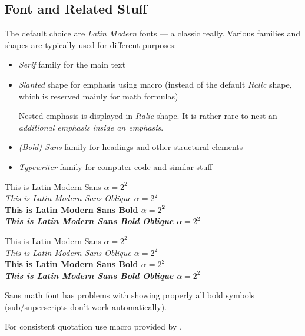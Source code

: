 \subsection{Font and Related Stuff}%
\label{sub:Font}

The default choice are \emph{Latin Modern} fonts --- a classic really.
Various families and shapes are typically used for different purposes:
\begin{itemize}
    \item \emph{Serif} family for the main text
    \item \emph{Slanted} shape for emphasis using \macro{\emph} macro (instead of the default \emph{Italic} shape, which is reserved mainly for math formulas)
          \begin{remark}
              Nested emphasis is displayed in \emph{Italic} shape.
              It is rather rare to nest an \emph{additional \emph{emphasis} inside an emphasis}.
          \end{remark}
    \item \emph{(Bold) Sans} family for headings and other structural elements
    \item \emph{Typewriter} family for computer code and similar stuff
\end{itemize}

{                  This is Latin Modern Sans \(\alpha = 2^{2}\)}\\
{\slshape          This is Latin Modern Sans Oblique \(\alpha = 2^{2}\)}\\
{\bfseries         This is Latin Modern Sans Bold \(\alpha = 2^{\bm{{2}}}\)}\\
{\bfseries\slshape This is Latin Modern Sans Bold Oblique \(\alpha = 2^{2}\)}

{\sffamily                  This is Latin Modern Sans \(\alpha = 2^{2}\)}\\
{\sffamily\slshape          This is Latin Modern Sans Oblique \(\alpha = 2^{2}\)}\\
{\sffamily\bfseries         This is Latin Modern Sans Bold \(\alpha = 2^{2}\)}\\
{\sffamily\bfseries\slshape This is Latin Modern Sans Bold Oblique \(\alpha = 2^{2}\)}
\begin{Note}
    Sans math font has problems with showing properly all bold symbols (sub/superscripts don't work automatically).
\end{Note}

For consistent quotation use \macro{\enquote} macro provided by .

